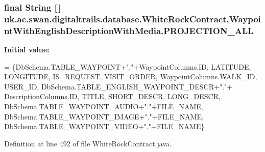 \hypertarget{classuk_1_1ac_1_1swan_1_1digitaltrails_1_1database_1_1_white_rock_contract_1_1_waypoint_with_english_description_with_media_a0d0c6a1b9cfafec45bf300d91ecd6c5e}{
\subsubsection[{P\+R\+O\+J\+E\+C\+T\+I\+O\+N\+\_\+\+A\+L\+L}]{\setlength{\rightskip}{0pt plus 5cm}final String \mbox{[}$\,$\mbox{]} uk.\+ac.\+swan.\+digitaltrails.\+database.\+White\+Rock\+Contract.\+Waypoint\+With\+English\+Description\+With\+Media.\+P\+R\+O\+J\+E\+C\+T\+I\+O\+N\+\_\+\+A\+L\+L\hspace{0.3cm}{\ttfamily [static]}}}\label{classuk_1_1ac_1_1swan_1_1digitaltrails_1_1database_1_1_white_rock_contract_1_1_waypoint_with_english_description_with_media_a0d0c6a1b9cfafec45bf300d91ecd6c5e}
{\bfseries Initial value\+:}
\begin{DoxyCode}
= \{DbSchema.TABLE\_WAYPOINT+\textcolor{stringliteral}{"."}+WaypointColumns.ID, LATITUDE, LONGITUDE, IS\_REQUEST, VISIT\_ORDER,
                                                        WaypointColumns.WALK\_ID, USER\_ID,
                                                        DbSchema.TABLE\_ENGLISH\_WAYPOINT\_DESCR+\textcolor{stringliteral}{"."}+
      DescriptionColumns.ID, TITLE, SHORT\_DESCR, LONG\_DESCR,
                                                        DbSchema.TABLE\_WAYPOINT\_AUDIO+\textcolor{stringliteral}{"."}+FILE\_NAME,
                                                        DbSchema.TABLE\_WAYPOINT\_IMAGE+\textcolor{stringliteral}{"."}+FILE\_NAME,
                                                        DbSchema.TABLE\_WAYPOINT\_VIDEO+\textcolor{stringliteral}{"."}+FILE\_NAME\}
\end{DoxyCode}


Definition at line 492 of file White\+Rock\+Contract.\+java.

